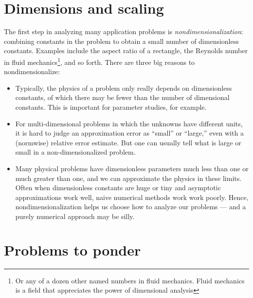 \documentclass[12pt, leqno]{article}
\begin{document}
\section{Dimensions and scaling}

The first step in analyzing many application problems is
{\em nondimensionalization}: combining constants in the
problem to obtain a small number of dimensionless constants.
Examples include the aspect ratio of a rectangle,
the Reynolds number in fluid mechanics\footnote{%
Or any of a dozen other named numbers in fluid mechanics.  Fluid
mechanics is a field that appreciates the power of dimensional
analysis}, and so forth.  There are three big reasons to
nondimensionalize:
\begin{itemize}
\item
  Typically, the physics of a problem only really depends on
  dimensionless constants, of which there may be fewer than
  the number of dimensional constants.  This is important
  for parameter studies, for example.
\item
  For multi-dimensional problems in which the unknowns have different
  units, it is hard to judge an approximation error as ``small'' or
  ``large,'' even with a (normwise) relative error estimate.  But one
  can usually tell what is large or small in a non-dimensionalized
  problem.
\item
  Many physical problems have dimensionless parameters much less than
  one or much greater than one, and we can approximate the physics in
  these limits.  Often when dimensionless constants are huge or tiny
  and asymptotic approximations work well, naive numerical methods
  work work poorly.  Hence, nondimensionalization helps us choose how
  to analyze our problems --- and a purely numerical approach may be
  silly.
\end{itemize}

\section{Problems to ponder}
\end{document}
